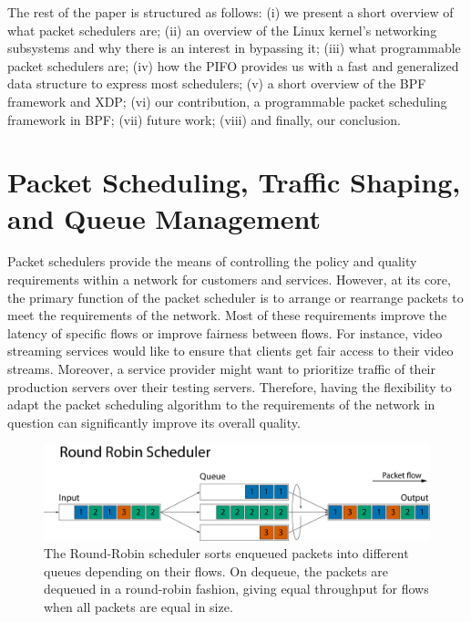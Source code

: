 \documentclass[sigconf, nonacm]{acmart}
\begin{document}
The rest of the paper is structured as follows: (i) we present a short overview of what packet schedulers are; (ii) an overview of the Linux kernel's networking subsystems and why there is an interest in bypassing it; (iii) what programmable packet schedulers are; (iv) how the PIFO provides us with a fast and generalized data structure to express most schedulers; (v) a short overview of the BPF framework and XDP; (vi) our contribution, a programmable packet scheduling framework in BPF; (vii) future work; (viii) and finally, our conclusion.




\section{Packet Scheduling, Traffic Shaping, and Queue Management}

Packet schedulers provide the means of controlling the policy and quality requirements within a network for customers and services. However, at its core, the primary function of the packet scheduler is to arrange or rearrange packets to meet the requirements of the network. Most of these requirements improve the latency of specific flows or improve fairness between flows. For instance, video streaming services would like to ensure that clients get fair access to their video streams. Moreover, a service provider might want to prioritize traffic of their production servers over their testing servers. Therefore, having the flexibility to adapt the packet scheduling algorithm to the requirements of the network in question can significantly improve its overall quality.

\begin{figure}
  \includegraphics[width=\linewidth]{round-robin.pdf}
  \caption{The Round-Robin scheduler sorts enqueued packets into different queues depending on their flows. On dequeue, the packets are dequeued in a round-robin fashion, giving equal throughput for flows when all packets are equal in size.}
  \label{fig:round_robin}
\end{figure}
\end{document}
